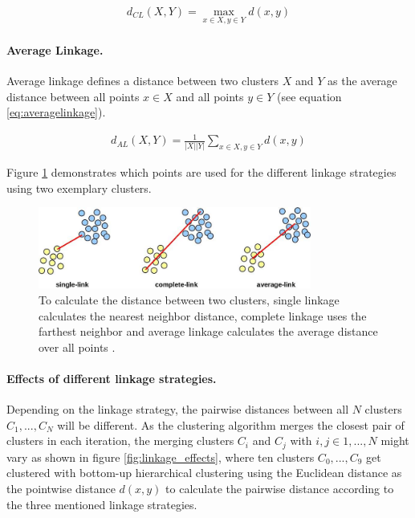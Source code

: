 \begin{equation}
    \begin{aligned}
        d_{CL}(X,Y) = \max\limits_{x \in X, y \in Y} d(x,y)
    \end{aligned}
    \label{eq:completelinkage}
\end{equation}

\paragraph{Average Linkage.}

Average linkage defines a distance between two clusters $X$ and $Y$ as the average distance between all points $x \in X$ and all points $y \in Y$ (see equation \ref{eq:averagelinkage}).

\begin{equation}
    \begin{aligned}
        d_{AL}(X,Y) = \frac{1}{|X||Y|}\sum\limits_{x \in X, y \in Y} d(x,y)
    \end{aligned}
    \label{eq:averagelinkage}
\end{equation}

Figure \ref{fig:linkage_types} demonstrates which points are used for the different linkage strategies using two exemplary clusters.

\begin{figure}[h]
    \centering
    \includegraphics[width=0.8\textwidth]{images/linkage_types}
    \caption{To calculate the distance between two clusters, single linkage calculates the nearest neighbor distance, complete linkage uses the farthest neighbor and average linkage calculates the average distance over all points \cite{linkage_types}.}
    \label{fig:linkage_types}
\end{figure}

\paragraph{Effects of different linkage strategies.}

Depending on the linkage strategy, the pairwise distances between all $N$ clusters $C_1, ..., C_N$ will be different. As the clustering algorithm merges the closest pair of clusters in each iteration, the merging clusters $C_i$ and $C_j$ with $i, j \in 1,...,N$ might vary as shown in figure \ref{fig:linkage_effects}, where ten clusters $C_0, ..., C_9$ get clustered with bottom-up hierarchical clustering using the Euclidean distance as the pointwise distance $d(x,y)$ to calculate the pairwise distance according to the three mentioned linkage strategies.

